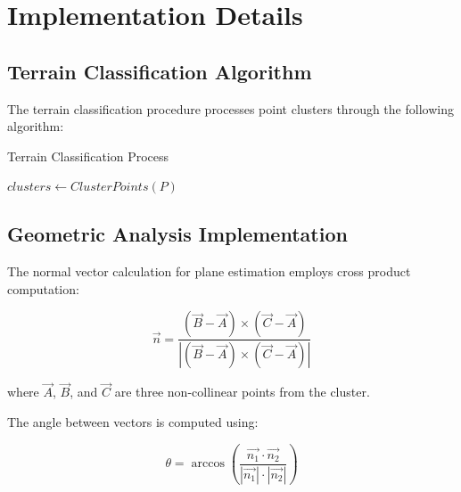 \documentclass[conference]{IEEEtran}
\begin{document}
\section{Implementation Details}

\subsection{Terrain Classification Algorithm}

The terrain classification procedure processes point clusters through the following algorithm:

\begin{algorithm}
\caption{Terrain Classification Process}
\SetAlgoLined
{}
$clusters \leftarrow ClusterPoints(P)$\;
\end{algorithm}

\subsection{Geometric Analysis Implementation}

The normal vector calculation for plane estimation employs cross product computation:

\begin{equation}
    \vec{n} = \frac{(\vec{B} - \vec{A}) \times (\vec{C} - \vec{A})}{|(\vec{B} - \vec{A}) \times (\vec{C} - \vec{A})|}
\end{equation}

where $\vec{A}$, $\vec{B}$, and $\vec{C}$ are three non-collinear points from the cluster.

The angle between vectors is computed using:

\begin{equation}
    \theta = \arccos\left(\frac{\vec{n_1} \cdot \vec{n_2}}{|\vec{n_1}| \cdot |\vec{n_2}|}\right)
\end{equation}
\end{document}
